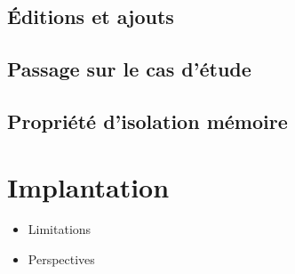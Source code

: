 \documentclass{phdthesis}
\begin{document}
\section{Éditions et ajouts}
\section{Passage sur le cas d'étude}
\section{Propriété d'isolation mémoire}

\chapter{Implantation}


\begin{itemize}
  \item Limitations
  \item Perspectives
\end{itemize}

%
%
\end{document}
